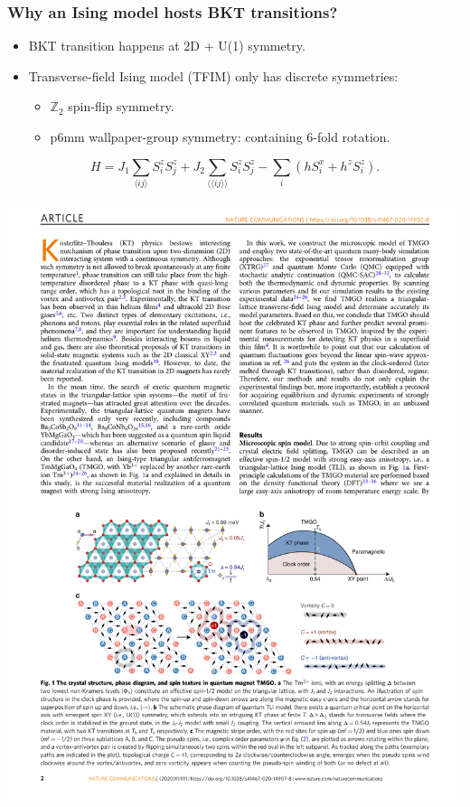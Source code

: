 \documentclass[xcolor=table, aspectratio=1610,ignorenonframetext]{beamer}
\begin{document}
\begin{frame}
  \frametitle{Why an Ising model hosts BKT transitions?}
  \begin{itemize}
    \item BKT transition happens at 2D + U(1) symmetry.
    \item Transverse-field Ising model (TFIM) only has discrete symmetries:
    \begin{itemize}
      \item $\mathbb Z_2$ spin-flip symmetry.
      \item p6mm wallpaper-group symmetry: containing 6-fold rotation.
    \end{itemize}
  \end{itemize}
  \[H = J_1\sum_{\langle ij\rangle}S_i^zS_j^z +J_2\sum_{\langle\langle ij\rangle\rangle}S_i^zS_j^z - \sum_i\left(hS_i^x + h^zS_i^z\right). \]

  \begin{center}
    \includegraphics{lattice-afm}
  \end{center}
\end{frame}
\end{document}
